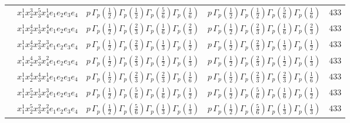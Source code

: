 \documentclass[11pt]{article}
\begin{document}
\begin{table}[ht]
{\begin{tabular}{@{}lllll@{}}
 & $x_{1}^{1} x_{2}^{3} x_{3}^{5} x_{4}^{1}  e_{1} e_{2} e_{3} e_{4}$ & $p \, \Gamma_p \left( \frac{1}{2} \right) \Gamma_p \left( \frac{1}{2} \right) \Gamma_p \left( \frac{5}{6} \right) \Gamma_p \left( \frac{1}{6} \right)$ & $p \, \Gamma_p \left( \frac{1}{2} \right) \Gamma_p \left( \frac{1}{2} \right) \Gamma_p \left( \frac{5}{6} \right) \Gamma_p \left( \frac{1}{6} \right)$ & $433$ \\
 & $x_{1}^{1} x_{2}^{4} x_{3}^{1} x_{4}^{4}  e_{1} e_{2} e_{3} e_{4}$ & $p \, \Gamma_p \left( \frac{1}{2} \right) \Gamma_p \left( \frac{2}{3} \right) \Gamma_p \left( \frac{1}{6} \right) \Gamma_p \left( \frac{2}{3} \right)$ & $p \, \Gamma_p \left( \frac{1}{2} \right) \Gamma_p \left( \frac{2}{3} \right) \Gamma_p \left( \frac{1}{6} \right) \Gamma_p \left( \frac{2}{3} \right)$ & $433$ \\
 & $x_{1}^{1} x_{2}^{4} x_{3}^{2} x_{4}^{3}  e_{1} e_{2} e_{3} e_{4}$ & $p \, \Gamma_p \left( \frac{1}{2} \right) \Gamma_p \left( \frac{2}{3} \right) \Gamma_p \left( \frac{1}{3} \right) \Gamma_p \left( \frac{1}{2} \right)$ & $p \, \Gamma_p \left( \frac{1}{2} \right) \Gamma_p \left( \frac{2}{3} \right) \Gamma_p \left( \frac{1}{3} \right) \Gamma_p \left( \frac{1}{2} \right)$ & $433$ \\
 & $x_{1}^{1} x_{2}^{4} x_{3}^{3} x_{4}^{2}  e_{1} e_{2} e_{3} e_{4}$ & $p \, \Gamma_p \left( \frac{1}{2} \right) \Gamma_p \left( \frac{2}{3} \right) \Gamma_p \left( \frac{1}{2} \right) \Gamma_p \left( \frac{1}{3} \right)$ & $p \, \Gamma_p \left( \frac{1}{2} \right) \Gamma_p \left( \frac{2}{3} \right) \Gamma_p \left( \frac{1}{2} \right) \Gamma_p \left( \frac{1}{3} \right)$ & $433$ \\
 & $x_{1}^{1} x_{2}^{4} x_{3}^{4} x_{4}^{1}  e_{1} e_{2} e_{3} e_{4}$ & $p \, \Gamma_p \left( \frac{1}{2} \right) \Gamma_p \left( \frac{2}{3} \right) \Gamma_p \left( \frac{2}{3} \right) \Gamma_p \left( \frac{1}{6} \right)$ & $p \, \Gamma_p \left( \frac{1}{2} \right) \Gamma_p \left( \frac{2}{3} \right) \Gamma_p \left( \frac{2}{3} \right) \Gamma_p \left( \frac{1}{6} \right)$ & $433$ \\
 & $x_{1}^{1} x_{2}^{5} x_{3}^{1} x_{4}^{3}  e_{1} e_{2} e_{3} e_{4}$ & $p \, \Gamma_p \left( \frac{1}{2} \right) \Gamma_p \left( \frac{5}{6} \right) \Gamma_p \left( \frac{1}{6} \right) \Gamma_p \left( \frac{1}{2} \right)$ & $p \, \Gamma_p \left( \frac{1}{2} \right) \Gamma_p \left( \frac{5}{6} \right) \Gamma_p \left( \frac{1}{6} \right) \Gamma_p \left( \frac{1}{2} \right)$ & $433$ \\
 & $x_{1}^{1} x_{2}^{5} x_{3}^{2} x_{4}^{2}  e_{1} e_{2} e_{3} e_{4}$ & $p \, \Gamma_p \left( \frac{1}{2} \right) \Gamma_p \left( \frac{5}{6} \right) \Gamma_p \left( \frac{1}{3} \right) \Gamma_p \left( \frac{1}{3} \right)$ & $p \, \Gamma_p \left( \frac{1}{2} \right) \Gamma_p \left( \frac{5}{6} \right) \Gamma_p \left( \frac{1}{3} \right) \Gamma_p \left( \frac{1}{3} \right)$ & $433$ \\

\end{tabular}}
\end{table}
\end{document}
